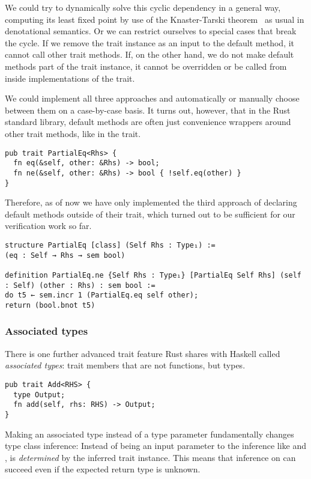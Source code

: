 We could try to dynamically solve this cyclic dependency in a general way, computing its least fixed point
by use of the Knaster-Tarski theorem~\cite{tarski1955lattice} as usual in
denotational semantics. Or we can restrict ourselves to special cases that break
the cycle. If we remove the trait instance as an input to the default method, it
cannot call other trait methods. If, on the other hand, we do not make default
methods part of the trait instance, it
cannot be overridden or be called from inside implementations of the trait.

We could implement all three approaches and automatically or manually choose
between them on a case-by-case basis. It turns out, however, that in the Rust standard library, default methods are often just
convenience wrappers around other trait methods, like in the  trait.

\begin{verbatim}
pub trait PartialEq<Rhs> {
  fn eq(&self, other: &Rhs) -> bool;
  fn ne(&self, other: &Rhs) -> bool { !self.eq(other) }
}
\end{verbatim}

Therefore, as of now we have only implemented the third approach of declaring
default methods outside of their trait, which turned out to be sufficient for
our verification work so far.

\begin{verbatim}
structure PartialEq [class] (Self Rhs : Type₁) :=
(eq : Self → Rhs → sem bool)

definition PartialEq.ne {Self Rhs : Type₁} [PartialEq Self Rhs] (self : Self) (other : Rhs) : sem bool :=
do t5 ← sem.incr 1 (PartialEq.eq self other);
return (bool.bnot t5)
\end{verbatim}

\subsubsection{Associated types}

There is one further advanced trait feature Rust shares with Haskell called
\emph{associated types}: trait members that are not functions, but types.

\begin{verbatim}
pub trait Add<RHS> {
  type Output;
  fn add(self, rhs: RHS) -> Output;
}
\end{verbatim}

Making  an associated type instead of a type parameter
fundamentally changes type class inference: Instead of being an input parameter
to the inference like  and ,  is
\emph{determined} by the inferred trait instance. This means that inference on
 can succeed even if the expected return type is unknown.

